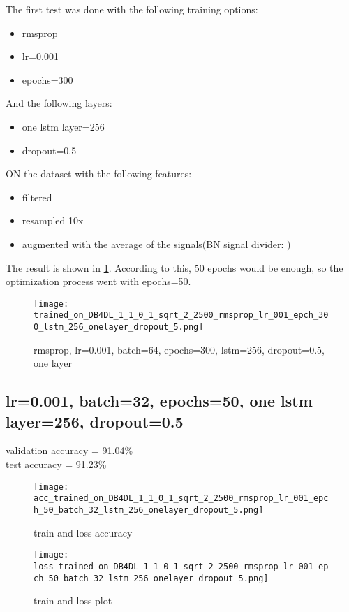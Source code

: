 \documentclass{article}
\begin{document}
The first test was done with the following training options:
\begin{itemize}
    \item rmsprop
    \item lr=0.001 
    \item epochs=300
\end{itemize}
And the following layers:
\begin{itemize}
    \item one lstm layer=256
    \item dropout=0.5
\end{itemize}
ON the dataset with the following features:
\begin{itemize}
    \item filtered
    \item resampled 10x
    \item augmented with the average of the signals(BN signal divider: )
\end{itemize}
\newpage
The result is shown in \figurename{\ref{trained_on_DB4DL_1_1_0_1_sqrt_2_2500_rmsprop_lr_001_epch_300_lstm_256_onelayer_dropout_5}}. According to this, 50 epochs would be enough, so the optimization process went with epochs=50. 

\begin{figure}[H]
\centering
\texttt{[image: trained\_on\_DB4DL\_1\_1\_0\_1\_sqrt\_2\_2500\_rmsprop\_lr\_001\_epch\_300\_lstm\_256\_onelayer\_dropout\_5.png]}
\caption{rmsprop, lr=0.001, batch=64, epochs=300, lstm=256, dropout=0.5, one layer}
\label{trained_on_DB4DL_1_1_0_1_sqrt_2_2500_rmsprop_lr_001_epch_300_lstm_256_onelayer_dropout_5}
\end{figure}

\bigskip
\subsection{lr=0.001, batch=32, epochs=50, one lstm layer=256, dropout=0.5}
validation accuracy = 91.04\%
\\
test accuracy = 91.23\%

\begin{figure}[H]
\centering
\texttt{[image: acc\_trained\_on\_DB4DL\_1\_1\_0\_1\_sqrt\_2\_2500\_rmsprop\_lr\_001\_epch\_50\_batch\_32\_lstm\_256\_onelayer\_dropout\_5.png]}
\caption{train and loss accuracy}
\end{figure}

\begin{figure}[H]
\centering
\texttt{[image: loss\_trained\_on\_DB4DL\_1\_1\_0\_1\_sqrt\_2\_2500\_rmsprop\_lr\_001\_epch\_50\_batch\_32\_lstm\_256\_onelayer\_dropout\_5.png]}
\caption{train and loss plot}
\end{figure}
\end{document}
